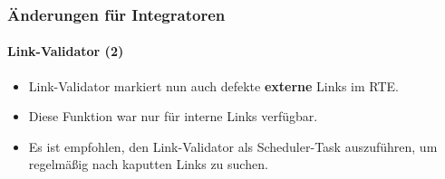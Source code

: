 
\begin{frame}[fragile]
	\frametitle{Änderungen für Integratoren}
	\framesubtitle{Link-Validator (2)}

	\begin{itemize}
		\item Link-Validator markiert nun auch defekte \textbf{externe} Links im RTE.
		\item Diese Funktion war nur für interne Links verfügbar.
		\item Es ist empfohlen, den Link-Validator als Scheduler-Task auszuführen, um regelmäßig nach kaputten Links zu suchen.
	\end{itemize}

\end{frame}

